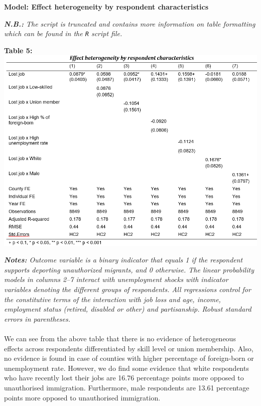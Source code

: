 \documentclass[12pt,letterpaper]{article}
\begin{document}
\textbf{Model: Effect heterogeneity by respondent characteristics}

\textit{\textbf{N.B.:} The script is truncated and contains more information on table formatting which can be found in the \texttt{R} script file.}
\pagebreak
\begin{center}
	\textbf{Table 5:}
	\includegraphics{Heterogeneity.png} 
\end{center}
\textit{\textbf{Notes:} Outcome variable is a binary indicator that equals 1 if the respondent supports deporting unauthorized migrants, and 0 otherwise. The linear probability models in columns 2–7 interact with unemployment shocks with indicator variables denoting the different groups of respondents. All regressions control for the constitutive terms of the interaction with job loss and age, income, employment status (retired, disabled or other) and partisanship. Robust standard errors in parentheses.}\\
\\We can see from the above table that there is no evidence of heterogeneous effects across respondents differentiated by skill level or union membership. Also, no evidence is found in case of counties with higher percentage of foreign-born or unemployment rate. However, we do find some evidence that white respondents who have recently lost their jobs are 16.76 percentage points more opposed to unauthorised immigration. Furthermore, male respondents are 13.61 percentage points more opposed to unauthorised immigration. 

\pagebreak
\end{document}

